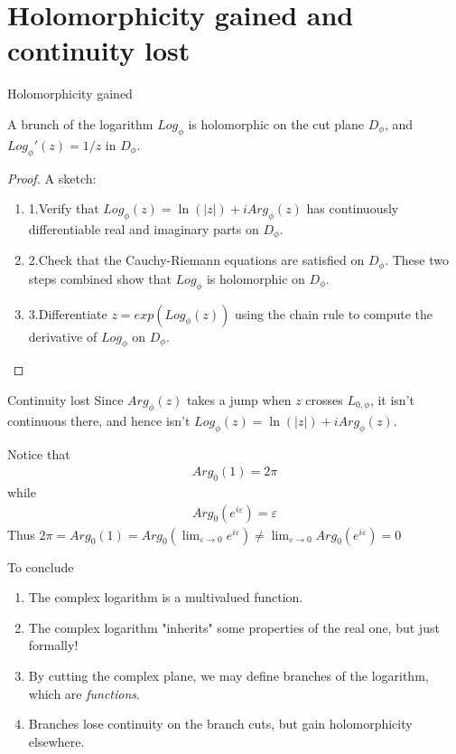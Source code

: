 \documentclass{beamer}
\begin{document}
\section{Holomorphicity gained and continuity lost}
\begin{frame}{Holomorphicity gained}

	\begin{theorem}[1.7.10 on p.18, Gratwick]
	A brunch of the logarithm $Log_{\phi}$ is holomorphic on the cut plane $D_\phi$, and $Log_{\phi}'(z)=1/z$ in $D_\phi$.
	\end{theorem}\pause
	
	\begin{proof}
	A sketch:
		\begin{enumerate}
			\item 1.Verify that $Log_{\phi}(z)=\ln(|z|)+iArg_{\phi}(z)$ has continuously differentiable real and imaginary parts on $D_\phi$.\pause
			\item 2.Check that the Cauchy-Riemann equations are satisfied on $D_\phi$. These two steps combined show that $Log_\phi$ is holomorphic on $D_\phi$.\pause
			\item 3.Differentiate $z=exp(Log_\phi(z))$ using the chain rule to compute the derivative of $Log_{\phi}$ on $D_\phi$.
		\end{enumerate}
	\end{proof}
	
	
	
	
\end{frame}

\begin{frame}{Continuity lost}
	Since $Arg_\phi(z)$ takes a jump when $z$ crosses $L_{0,\phi}$,  it isn't continuous there, and hence isn't $Log_\phi(z)=\ln(|z|)+iArg_\phi(z)$.\pause
	
	\begin{example}
	 Notice that \begin{align*}
	 	Arg_0(1)=2\pi
	 \end{align*} while 
	 \begin{align*}
	 	Arg_0(e^{i\varepsilon})=\varepsilon
	 \end{align*}
	 Thus $2\pi=Arg_0(1)=Arg_0(\lim_{\varepsilon\to 0}e^{i\varepsilon})\neq\lim_{\varepsilon\to0}Arg_0(e^{i\varepsilon})=0$
\end{example}
\end{frame}



\begin{frame}{To conclude}
	\begin{enumerate}
		\item The complex logarithm is a multivalued function.\pause
		\item The complex logarithm "inherits" some properties of the real one, but just formally!\pause
		\item By cutting the complex plane, we may define branches of the logarithm, which are \emph{functions}.\pause
		\item Branches lose continuity on the branch cuts, but gain holomorphicity elsewhere.\pause
	\end{enumerate}
\end{frame}
\end{document}
